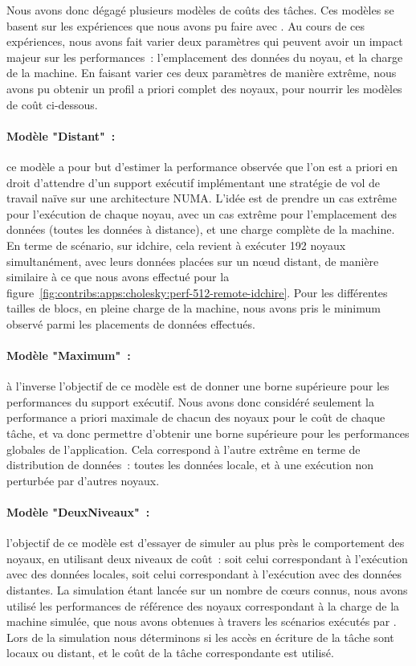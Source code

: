 Nous avons donc dégagé plusieurs modèles de coûts des tâches.
Ces modèles se basent sur les expériences que nous avons pu faire avec \outil.
Au cours de ces expériences, nous avons fait varier deux paramètres qui peuvent avoir un impact majeur sur les performances~: l'emplacement des données du noyau, et la charge de la machine.
En faisant varier ces deux paramètres de manière extrême, nous avons pu obtenir un profil a priori complet des noyaux, pour nourrir les modèles de coût ci-dessous.

\paragraph{Modèle "Distant"~:} ce modèle a pour but d'estimer la performance observée que l'on est a priori en droit d'attendre d'un support exécutif implémentant une stratégie de vol de travail naïve sur une architecture NUMA.
L'idée est de prendre un cas extrême pour l'exécution de chaque noyau, avec un cas extrême pour l'emplacement des données (toutes les données à distance), et une charge complète de la machine.
En terme de scénario, sur idchire, cela revient à exécuter 192 noyaux simultanément, avec leurs données placées sur un nœud distant, de manière similaire à ce que nous avons effectué pour la figure~\ref{fig:contribs:apps:cholesky:perf-512-remote-idchire}.
Pour les différentes tailles de blocs, en pleine charge de la machine, nous avons pris le minimum observé parmi les placements de données effectués.

\paragraph{Modèle "Maximum"~:} à l'inverse l'objectif de ce modèle est de donner une borne supérieure pour les performances du support exécutif.
Nous avons donc considéré seulement la performance a priori maximale de chacun des noyaux pour le coût de chaque tâche, et va donc permettre d'obtenir une borne supérieure pour les performances globales de l'application.
Cela correspond à l'autre extrême en terme de distribution de données~: toutes les données locale, et à une exécution non perturbée par d'autres noyaux.

\paragraph{Modèle "DeuxNiveaux"~:} l'objectif de ce modèle est d'essayer de simuler au plus près le comportement des noyaux, en utilisant deux niveaux de coût~: soit celui correspondant à l'exécution avec des données locales, soit celui correspondant à l'exécution avec des données distantes.
La simulation étant lancée sur un nombre de cœurs connus, nous avons utilisé les performances de référence des noyaux correspondant à la charge de la machine simulée, que nous avons obtenues à travers les scénarios exécutés par \outil.
Lors de la simulation nous déterminons si les accès en écriture de la tâche sont locaux ou distant, et le coût de la tâche correspondante est utilisé.




